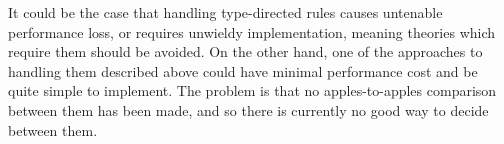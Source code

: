 It could be the case that handling type-directed rules causes untenable performance loss, or requires unwieldy implementation, meaning theories which require them should be avoided.
On the other hand, one of the approaches to handling them described above could have minimal performance cost and be quite simple to implement.
The problem is that no apples-to-apples comparison between them has been made, and so there is currently no good way to decide between them.

%

